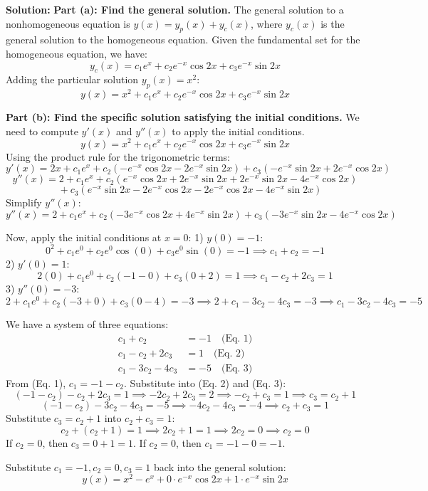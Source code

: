 \documentclass[11pt,letterpaper]{article}
\begin{document}
\textbf{Solution:}
\textbf{Part (a): Find the general solution.}
The general solution to a nonhomogeneous equation is $y(x) = y_p(x) + y_c(x)$, where $y_c(x)$ is the general solution to the homogeneous equation.
Given the fundamental set for the homogeneous equation, we have:
\[ y_c(x) = c_1 e^x + c_2 e^{-x}\cos 2x + c_3 e^{-x}\sin 2x \]
Adding the particular solution $y_p(x) = x^2$:
\[ y(x) = x^2 + c_1 e^x + c_2 e^{-x}\cos 2x + c_3 e^{-x}\sin 2x \]

\textbf{Part (b): Find the specific solution satisfying the initial conditions.}
We need to compute $y'(x)$ and $y''(x)$ to apply the initial conditions.
\[ y(x) = x^2 + c_1 e^x + c_2 e^{-x}\cos 2x + c_3 e^{-x}\sin 2x \]
Using the product rule for the trigonometric terms:
\[ y'(x) = 2x + c_1 e^x + c_2(-e^{-x}\cos 2x - 2e^{-x}\sin 2x) + c_3(-e^{-x}\sin 2x + 2e^{-x}\cos 2x) \]
\[ y''(x) = 2 + c_1 e^x + c_2(e^{-x}\cos 2x + 2e^{-x}\sin 2x + 2e^{-x}\sin 2x - 4e^{-x}\cos 2x) \]
\[ \quad + c_3(e^{-x}\sin 2x - 2e^{-x}\cos 2x - 2e^{-x}\cos 2x - 4e^{-x}\sin 2x) \]
Simplify $y''(x)$:
\[ y''(x) = 2 + c_1 e^x + c_2(-3e^{-x}\cos 2x + 4e^{-x}\sin 2x) + c_3(-3e^{-x}\sin 2x - 4e^{-x}\cos 2x) \]

Now, apply the initial conditions at $x = 0$:
1) $y(0) = -1$:
\[ 0^2 + c_1 e^0 + c_2 e^0 \cos(0) + c_3 e^0 \sin(0) = -1 \implies c_1 + c_2 = -1 \]
2) $y'(0) = 1$:
\[ 2(0) + c_1 e^0 + c_2(-1 - 0) + c_3(0 + 2) = 1 \implies c_1 - c_2 + 2c_3 = 1 \]
3) $y''(0) = -3$:
\[ 2 + c_1 e^0 + c_2(-3 + 0) + c_3(0 - 4) = -3 \implies 2 + c_1 - 3c_2 - 4c_3 = -3 \implies c_1 - 3c_2 - 4c_3 = -5 \]

We have a system of three equations:
\begin{align*}
    c_1 + c_2 &= -1 \quad \text{(Eq. 1)} \\
    c_1 - c_2 + 2c_3 &= 1 \quad \text{(Eq. 2)} \\
    c_1 - 3c_2 - 4c_3 &= -5 \quad \text{(Eq. 3)}
\end{align*}
From (Eq. 1), $c_1 = -1 - c_2$. Substitute into (Eq. 2) and (Eq. 3):
\[ (-1 - c_2) - c_2 + 2c_3 = 1 \implies -2c_2 + 2c_3 = 2 \implies -c_2 + c_3 = 1 \implies c_3 = c_2 + 1 \]
\[ (-1 - c_2) - 3c_2 - 4c_3 = -5 \implies -4c_2 - 4c_3 = -4 \implies c_2 + c_3 = 1 \]
Substitute $c_3 = c_2 + 1$ into $c_2 + c_3 = 1$:
\[ c_2 + (c_2 + 1) = 1 \implies 2c_2 + 1 = 1 \implies 2c_2 = 0 \implies c_2 = 0 \]
If $c_2 = 0$, then $c_3 = 0 + 1 = 1$.
If $c_2 = 0$, then $c_1 = -1 - 0 = -1$.

Substitute $c_1 = -1, c_2 = 0, c_3 = 1$ back into the general solution:
\[ y(x) = x^2 - e^x + 0 \cdot e^{-x}\cos 2x + 1 \cdot e^{-x}\sin 2x \]
\end{document}
